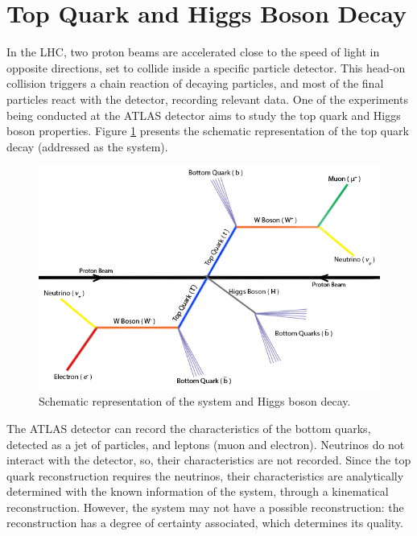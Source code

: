 \section{Top Quark and Higgs Boson Decay}
\label{problem_and_app}

In the LHC, two proton beams are accelerated close to the speed of light in opposite directions, set to collide inside a specific particle detector. This head-on collision triggers a chain reaction of decaying particles, and most of the final particles react with the detector, recording relevant data. One of the experiments being conducted at the ATLAS detector aims to study the top quark and Higgs boson properties. Figure \ref{fig:ttbar} presents the schematic representation of the top quark decay (addressed as the \ttbar system).

\begin{figure}[!htp]
	\begin{center}
		\includegraphics[scale=0.45]{images/ttbar_higgs.png}
		\caption{Schematic representation of the \ttbar system and Higgs boson decay.}
		\label{fig:ttbar}
	\end{center}
\end{figure}

The ATLAS detector can record the characteristics of the bottom quarks, detected as a jet of particles, and leptons (muon and electron). Neutrinos do not interact with the detector, so, their characteristics are not recorded. Since the top quark reconstruction requires the neutrinos, their characteristics are analytically determined with the known information of the system, through a kinematical reconstruction. However, the \ttbar system may not have a possible reconstruction: the reconstruction has a degree of certainty associated, which determines its quality.

